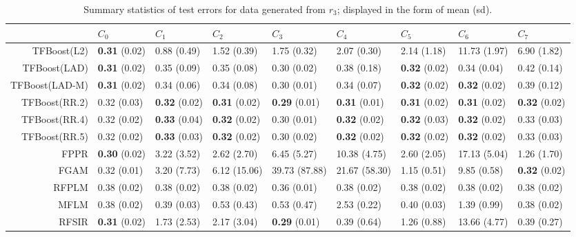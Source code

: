 \begin{table}[H]
\centering
\begin{tabular}{rllllllll}
  \hline
 & $C_0$ & $C_1$ & $C_2$ & $C_3$ & $C_4$ & $C_5$ & $C_6$ & $C_7$ \\ 
  \hline
TFBoost(L2) & \textbf{0.31} (0.02) & 0.88 (0.49) & 1.52 (0.39) & 1.75 (0.32) & 2.07 (0.30) & 2.14 (1.18) & 11.73 (1.97) & 6.90 (1.82) \\ 
  TFBoost(LAD) & \textbf{0.31} (0.02) & 0.35 (0.09) & 0.35 (0.08) & 0.30 (0.02) & 0.38 (0.18) & \textbf{0.32} (0.02) & 0.34 (0.04) & 0.42 (0.14) \\ 
  TFBoost(LAD-M) & \textbf{0.31} (0.02) & 0.34 (0.06) & 0.34 (0.08) & 0.30 (0.01) & 0.34 (0.07) & \textbf{0.32} (0.02) & \textbf{0.32} (0.02) & 0.39 (0.12) \\ 
  TFBoost(RR.2) & 0.32 (0.03) & \textbf{0.32} (0.02) & \textbf{0.31} (0.02) & \textbf{0.29} (0.01) & \textbf{0.31} (0.01) & \textbf{0.31} (0.02) & \textbf{0.31} (0.02) & \textbf{0.32} (0.02) \\ 
  TFBoost(RR.4) & 0.32 (0.02) & \textbf{0.33} (0.04) & \textbf{0.32} (0.02) & 0.30 (0.01) & \textbf{0.32} (0.02) & \textbf{0.32} (0.03) & \textbf{0.32} (0.02) & 0.33 (0.03) \\ 
  TFBoost(RR.5) & 0.32 (0.02) & \textbf{0.33} (0.03) & \textbf{0.32} (0.02) & 0.30 (0.02) & \textbf{0.32} (0.02) & \textbf{0.32} (0.02) & \textbf{0.32} (0.02) & 0.33 (0.03) \\ 
  FPPR & \textbf{0.30} (0.02) & 3.22 (3.52) & 2.62 (2.70) & 6.45 (5.27) & 10.38 (4.75) & 2.60 (2.05) & 17.13 (5.04) & 1.26 (1.70) \\ 
  FGAM & 0.32 (0.01) & 3.20 (7.73) & 6.12 (15.06) & 39.73 (87.88) & 21.67 (58.30) & 1.15 (0.51) & 9.85 (0.58) & \textbf{0.32} (0.02) \\ 
  RFPLM & 0.38 (0.02) & 0.38 (0.02) & 0.38 (0.02) & 0.36 (0.01) & 0.38 (0.02) & 0.38 (0.02) & 0.38 (0.02) & 0.38 (0.02) \\ 
  MFLM & 0.38 (0.02) & 0.39 (0.03) & 0.53 (0.43) & 0.53 (0.47) & 2.53 (0.22) & 0.40 (0.03) & 1.39 (0.99) & 0.38 (0.02) \\ 
  RFSIR & \textbf{0.31} (0.02) & 1.73 (2.53) & 2.17 (3.04) & \textbf{0.29} (0.01) & 0.39 (0.64) & 1.26 (0.88) & 13.66 (4.77) & 0.39 (0.27) \\ 
   \hline
\end{tabular}
\caption{Summary statistics of test errors for data generated from $r_3$; displayed in the form of mean (sd).} 
\end{table}
